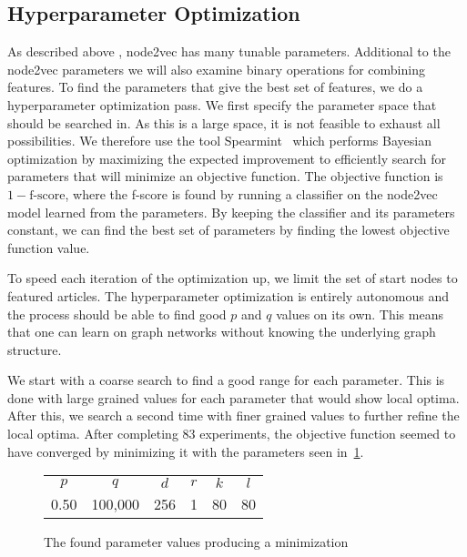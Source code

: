\subsection{Hyperparameter Optimization}
As described above , node2vec has many tunable parameters. Additional to the node2vec parameters we will also examine binary operations for combining features. To find the parameters that give the best set of features, we do a hyperparameter optimization pass. We first specify the parameter space that should be searched in. As this is a large space, it is not feasible to exhaust all possibilities. We therefore use the tool Spearmint~\cite{snoek2012practical} which performs Bayesian optimization by maximizing the expected improvement to efficiently search for parameters that will minimize an objective function. The objective function is $1 - \text{f-score}$, where the f-score is found by running a classifier on the node2vec model learned from the parameters. By keeping the classifier and its parameters constant, we can find the best set of parameters by finding the lowest objective function value.

To speed each iteration of the optimization up, we limit the set of start nodes to featured articles. The hyperparameter optimization is entirely autonomous and the process should be able to find good $p$ and $q$ values on its own. This means that one can learn on graph networks without knowing the underlying graph structure.

We start with a coarse search to find a good range for each parameter. This is done with large grained values for each parameter that would show local optima. After this, we search a second time with finer grained values to further refine the local optima. After completing 83 experiments, the objective function seemed to have converged by minimizing it with the parameters seen in~\cref{tab:paramopt_goodvalues}.

\begin{figure}%
\centering
\begin{tabular}{cccccc}
\toprule
$p$  & $q$     & $d$ & $r$ & $k$ & $l$ \\
0.50 & 100,000 & 256 & 1   & 80  & 80 \\
\bottomrule
\end{tabular}
\caption[The found parameter values producing a minimization]{The found parameter values producing a minimization}%
\label{tab:paramopt_goodvalues}%
\end{figure}

